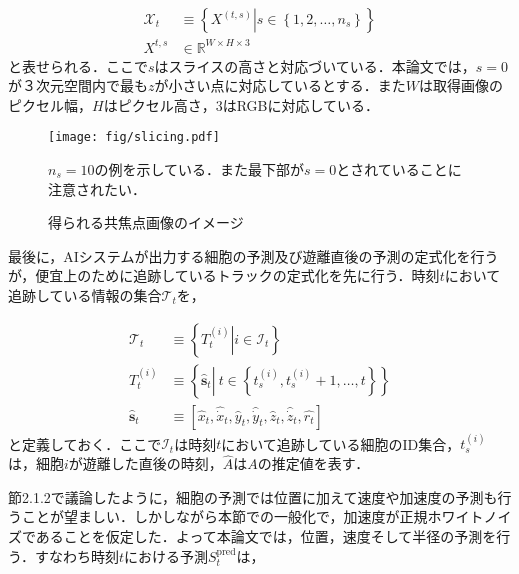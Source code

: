\begin{equation}
    \begin{aligned}
        \mathcal{X}_t &\equiv \left\{ \left.X^{(t,s)}\right| s \in \left\{1,2,\dots,n_s\right\} \right\}
        \\ X^{t,s} &\in \mathbb{R}^{W \times H \times 3}
    \end{aligned}
\end{equation}
と表せられる．ここで$s$はスライスの高さと対応づいている．本論文では，$s=0$が３次元空間内で最も$z$が小さい点に対応しているとする．また$W$は取得画像のピクセル幅，$H$はピクセル高さ，$3$はRGBに対応している．

\begin{figure}[t]
    \centering
    \texttt{[image: fig/slicing.pdf]}
    \caption{得られる共焦点画像のイメージ}
    \small
    $n_s=10$の例を示している．また最下部が$s=0$とされていることに注意されたい．
    \label{fig:slicing}
\end{figure}

\par
最後に，AIシステムが出力する細胞の予測及び遊離直後の予測の定式化を行うが，便宜上のために追跡しているトラックの定式化を先に行う．時刻$t$において追跡している情報の集合$\mathcal{T}_t$を，

\begin{equation}
    \begin{aligned}
        \mathcal{T}_t &\equiv \left\{ \left. T_t^{(i)}\right|i \in \mathcal{I}_t\right\}
        \\ T_t^{(i)} &\equiv \left\{ \hat{\bm{s}}_t \left|\ t \in \left\{t_s^{(i)}, t_s^{(i)}+1,\dots, t\right\} \right.\right\}
        \\\hat{\bm{s}}_{t} &\equiv \left[\hat{x}_{t}, \hat{\dot{x}}_{t}, \hat{y}_{t}, \hat{\dot{y}}_{t}, \hat{z}_{t}, \hat{\dot{z}}_{t}, \hat{r_{t}}\right]
    \end{aligned}
\end{equation}
と定義しておく．ここで$\mathcal{I}_t$は時刻$t$において追跡している細胞のID集合，$t_s^{(i)}$は，細胞$i$が遊離した直後の時刻，$\hat{A}$は$A$の推定値を表す．

節2.1.2で議論したように，細胞の予測では位置に加えて速度や加速度の予測も行うことが望ましい．しかしながら本節での一般化で，加速度が正規ホワイトノイズであることを仮定した．よって本論文では，位置，速度そして半径の予測を行う．すなわち時刻$t$における予測$S^{\text{pred}}_t$は，

